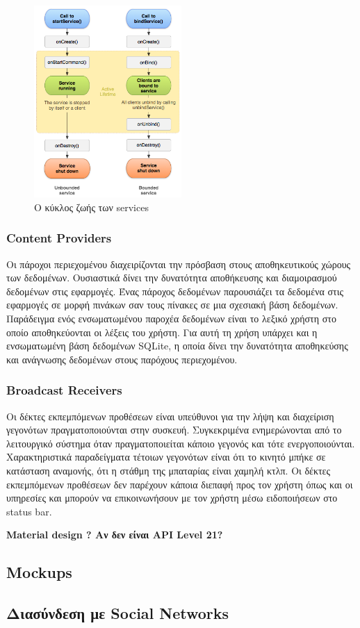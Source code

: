 		\begin{figure}[h]
			\centering
			\includegraphics[width=0.5\textwidth]{service_lifecycle.png}
			\caption{Ο κύκλος ζωής των services}
			\label{fig:service_lifecycle}
		\end{figure}
		
		\subsubsection{Content Providers}
		Οι πάροχοι περιεχομένου διαχειρίζονται την πρόσβαση στους αποθηκευτικούς χώρους των δεδομένων. Ουσιαστικά δίνει την δυνατότητα αποθήκευσης και διαμοιρασμού δεδομένων στις εφαρμογές. Ένας πάροχος δεδομένων παρουσιάζει τα δεδομένα στις εφαρμογές σε μορφή πινάκων σαν τους πίνακες σε μια σχεσιακή βάση δεδομένων. Παράδειγμα ενός ενσωματωμένου παροχέα δεδομένων είναι το λεξικό χρήστη στο οποίο αποθηκεύονται οι λέξεις του χρήστη. Για αυτή τη χρήση υπάρχει και η ενσωματωμένη βάση δεδομένων SQLite, η οποία δίνει την δυνατότητα αποθηκεύσης και ανάγνωσης δεδομένων στους παρόχους περιεχομένου.\cite{androidContentProviders}
		\subsubsection{Broadcast Receivers}
		Οι δέκτες εκπεμπόμενων προθέσεων είναι υπεύθυνοι για την λήψη και διαχείριση γεγονότων πραγματοποιούνται στην συσκευή. Συγκεκριμένα ενημερώνονται από το λειτουργικό σύστημα όταν πραγματοποιείται κάποιο γεγονός και τότε ενεργοποιούνται. Χαρακτηριστικά παραδείγματα τέτοιων γεγονότων είναι ότι το κινητό μπήκε σε κατάσταση αναμονής, ότι η στάθμη της μπαταρίας είναι χαμηλή κτλπ. Οι δέκτες εκπεμπόμενων προθέσεων δεν παρέχουν κάποια διεπαφή προς τον χρήστη όπως και οι υπηρεσίες και μπορούν να επικοινωνήσουν με τον χρήστη μέσω ειδοποιήσεων στο status bar.\cite{broadcastReceiver}

		\textbf{Material design ? Αν δεν είναι API Level 21?}
	\subsection{Mockups}
	\subsection{Διασύνδεση με Social Networks}
